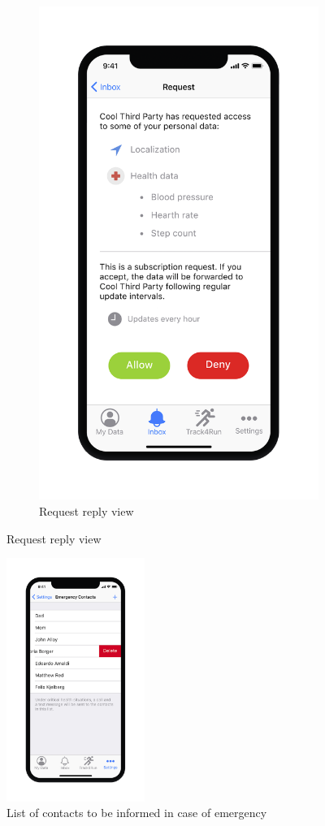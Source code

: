 \begin{figure}[H]
\begin{subfigure}{.5\textwidth}
  \includegraphics[width=.8\textwidth]{./Pictures/Mockup/mobile/request_received.png}
  \captionsetup{skip=0pt}
  \caption{Request reply view}
  \label{fig:mobile-request}
\end{subfigure}
\captionsetup{labelformat=empty}
\label{fig:test}
\end{figure}

\begin{figure}[H]
	\centering
	\includegraphics[width=0.4\textwidth]{./Pictures/Mockup/mobile/emergency_contacts.png}
	\captionsetup{skip=0pt}
	\caption{List of contacts to be informed in case of emergency}
\end{figure}


